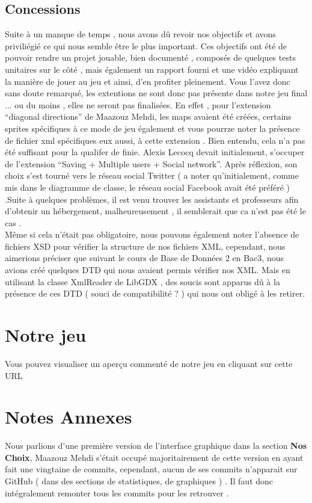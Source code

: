 \documentclass[a4paper,10pt]{article}
\begin{document}
\subsection{Concessions}
Suite à un manque de temps , nous avons dû revoir nos objectifs et avons priviliégié ce qui nous semble être le plus important. 
Ces objectifs ont été de pouvoir rendre un projet jouable, bien documenté , composés de quelques tests unitaires sur le côté , mais 
également un rapport fourni et une vidéo expliquant la manière de jouer au jeu et ainsi, d'en profiter pleinement. 
Vous l'avez donc sans doute remarqué, les extentions ne sont donc pas présente dans notre jeu final ... ou du moins , elles ne seront pas finalisées.
En effet , pour l'extension ``diagonal directions'' de Maazouz Mehdi, les maps avaient été créées, certains sprites spécifiques à ce mode de jeu également
et vous pourrze noter la présence de fichier xml spécifiques eux aussi, à cette extension . Bien entendu, cela n'a pas été suffisant pour la qualifer de finie.
Alexis Lecocq devait initialement, s'occuper de l'extension ``Saving + Multiple users + Social network''. Après réflexion, son choix
s'est tourné vers le réseau social Twitter ( a noter qu'initialement, comme mis dans le diagramme de classe, le réseau social Facebook avait été préféré )
.Suite à quelques problèmes, il est venu trouver les assistants et professeurs afin d'obtenir un hébergement,
malheureusement , il semblerait que ca n'est pas été le cas .\\

Même si cela n'était pas obligatoire, nous pouvons également noter l'absence de fichiers XSD pour vérifier la structure de nos fichiers XML, cependant,
 nous aimerions préciser que suivant le cours de Base de Données 2 en Bac3, nous avions créé quelques DTD qui nous avaient permis vérifier nos XML.
 Mais en utilisant la classe XmlReader de LibGDX , des soucis sont apparus dû à la présence de ces DTD ( souci de compatibilité ? ) qui nous ont obligé
 à les retirer.

\section{Notre jeu}
Vous pouvez visualiser un aperçu commenté de notre jeu en cliquant sur cette URL

\section{Notes Annexes}
Nous parlions d'une première version de l'interface graphique dans la section \textbf{Nos Choix}, Maazouz Mehdi s'était occupé majoritairement
de cette version en ayant fait une vingtaine de commits, cependant, aucun de ses commits n'apparait sur GitHub ( dans des sections de statistiques, 
de graphiques ) . Il faut donc intégralement remonter tous les commits pour les retrouver .
\end{document}
